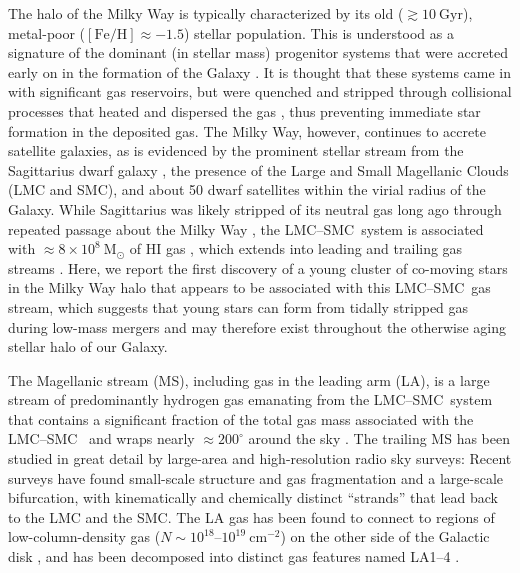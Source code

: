 \documentclass[twocolumn]{aastex62}
\newcommand{\msun}{\textrm{M}_\odot}
\newcommand{\feh}{\ensuremath{[\textrm{Fe} / \textrm{H}]}}
\newcommand{\hi}{H{\footnotesize I} }
\newcommand{\lmcsmc}{LMC--SMC}
\begin{document}
The halo of the Milky Way is typically characterized by its old ($\gtrsim 10~\textrm{Gyr}$), metal-poor ($\feh \approx -1.5$) stellar population.
This is understood as a signature of the dominant (in stellar mass) progenitor systems that were accreted early on in the formation of the Galaxy \citep[massive dwarf galaxies][]{Deason:2015, Fiorentino:2015}.
It is thought that these systems came in with significant gas reservoirs, but were quenched and stripped through collisional processes that heated and dispersed the gas \citep[e.g.,][]{Mayer:2006}, thus preventing immediate star formation in the deposited gas.
The Milky Way, however, continues to accrete satellite galaxies, as is evidenced by the prominent stellar stream from the Sagittarius dwarf galaxy \citep{Ibata:1994, Majewski:2003}, the presence of the Large and Small Magellanic Clouds (LMC and SMC), and about 50 dwarf satellites within the virial radius of the Galaxy.
While Sagittarius was likely stripped of its neutral gas long ago through repeated passage about the Milky Way \citep{Burton:1999, Tepper-Garcia:2018}, the \lmcsmc\ system is associated with $\approx 8\times 10^8~\msun$ of \hi gas \citep{Bruns:2005}, which extends into leading and trailing gas streams \citep{Mathewson:1974, Putman:1998, Bruns:2005, Nidever:2010}.
Here, we report the first discovery of a young cluster of co-moving stars in the Milky Way halo that appears to be associated with this \lmcsmc\ gas stream, which suggests that young stars can form from tidally stripped gas during low-mass mergers and may therefore exist throughout the otherwise aging stellar halo of our Galaxy.

The Magellanic stream (MS), including gas in the leading arm (LA), is a large stream of predominantly hydrogen gas emanating from the \lmcsmc\ system that contains a significant fraction of the total gas mass associated with the \lmcsmc\ \citep{Bruns:2005} and wraps nearly $\approx 200^\circ$ around the sky \citep{Mathewson:1974, Putman:1998, Bruns:2005, Nidever:2010}.
The trailing MS has been studied in great detail by large-area and high-resolution radio sky surveys: Recent surveys have found small-scale structure and gas fragmentation \citep[e.g.,][]{Nidever:2008, For:2014} and a large-scale bifurcation, with kinematically \citep{Nidever:2008} and chemically \citep{Fox:2013} distinct ``strands'' that lead back to the LMC and the SMC.
The LA gas has been found to connect to regions of low-column-density gas ($N\sim 10^{18}$--$10^{19}~\textrm{cm}^{-2}$) on the other side of the Galactic disk \citep{Putman:1998, Nidever:2008}, and has been decomposed into distinct gas features named LA1--4 \citep{Bruns:2005, Nidever:2008, Venzmer:2012}.
\end{document}
